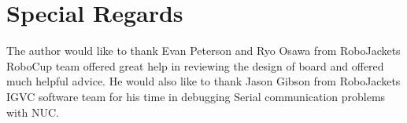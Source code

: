 \documentclass[letterpaper, 12pt]{article}
\begin{document}
\section{Special Regards}
The author would like to thank Evan Peterson and Ryo Osawa from RoboJackets RoboCup team offered great help in reviewing the design of board and offered much helpful advice. He would also like to thank Jason Gibson from RoboJackets IGVC software team for his time in debugging Serial communication problems with NUC.  
\end{document}
